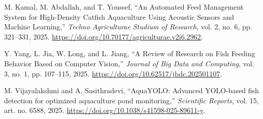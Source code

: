 \documentclass[11pt,a4paper]{article}
\begin{document}
{\begin{enumerate}[label={[\arabic*]}, leftmargin=2em]
    \item M. Kamal, M. Abdallah, and T. Youssef, ``An Automated Feed Management System for High-Density Catfish Aquaculture Using Acoustic Sensors and Machine Learning,'' \textit{Techno Agriculturae Studium of Research}, vol. 2, no. 6, pp. 321--331, 2025. \url{https://doi.org/10.70177/agriculturae.v2i6.2962}.
    \item Y. Yang, L. Jia, W. Long, and L. Jiang, ``A Review of Research on Fish Feeding Behavior Based on Computer Vision,'' \textit{Journal of Big Data and Computing}, vol. 3, no. 1, pp. 107--115, 2025. \url{https://doi.org/10.62517/jbdc.202501107}.
    \item M. Vijayalakshmi and A. Sasithradevi, ``AquaYOLO: Advanced YOLO-based fish detection for optimized aquaculture pond monitoring,'' \textit{Scientific Reports}, vol. 15, art. no. 6588, 2025. \url{https://doi.org/10.1038/s41598-025-89611-y}.
\end{enumerate}
}
\end{document}
